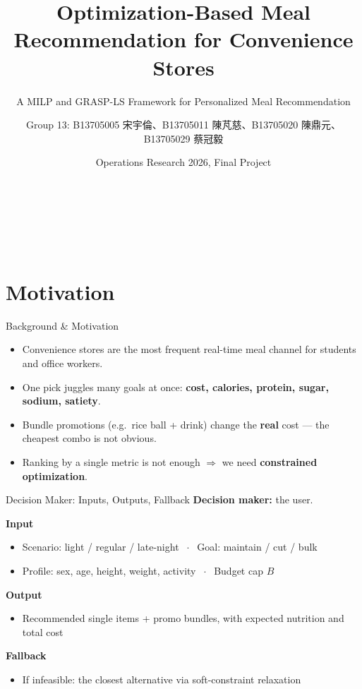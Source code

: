 \documentclass[10pt,aspectratio=169]{beamer}
\title{Optimization-Based Meal Recommendation for Convenience Stores}
\subtitle{A MILP and GRASP-LS Framework for Personalized Meal Recommendation}
\author{Group 13: B13705005 宋宇倫、B13705011 陳芃慈、B13705020 陳鼎元、B13705029 蔡冠毅}
\date{Operations Research 2026, Final Project}
\begin{document}
\begin{frame}
  \centering
  \vspace{0.6cm}
  {\normalsize\insertdate}\\[1.8cm]
  \resizebox{0.95\linewidth}{!}{\color{green!45!black}\bfseries\inserttitle}\\[12pt]
  {\normalsize\insertsubtitle}\\[2.1cm]
  {\footnotesize\insertauthor}
\end{frame}

\section{Motivation}
\begin{frame}{Background \& Motivation}
\begin{itemize}
  \item Convenience stores are the most frequent real-time meal channel for students and office workers.
  \item One pick juggles many goals at once: \textbf{cost, calories, protein, sugar, sodium, satiety}.
  \item Bundle promotions (e.g.\ rice ball + drink) change the \textbf{real} cost --- the cheapest combo is not obvious.
  \item Ranking by a single metric is not enough $\Rightarrow$ we need \textbf{constrained optimization}.
\end{itemize}
\end{frame}

\begin{frame}{Decision Maker: Inputs, Outputs, Fallback}
\textbf{Decision maker:} the user. \medskip

\textbf{Input}
\begin{itemize}
  \item Scenario: light / regular / late-night $\;\cdot\;$ Goal: maintain / cut / bulk
  \item Profile: sex, age, height, weight, activity $\;\cdot\;$ Budget cap $B$
\end{itemize}
\textbf{Output}
\begin{itemize}
  \item Recommended single items + promo bundles, with expected nutrition and total cost
\end{itemize}
\textbf{Fallback}
\begin{itemize}
  \item If infeasible: the closest alternative via soft-constraint relaxation
\end{itemize}
\end{frame}
\end{document}
